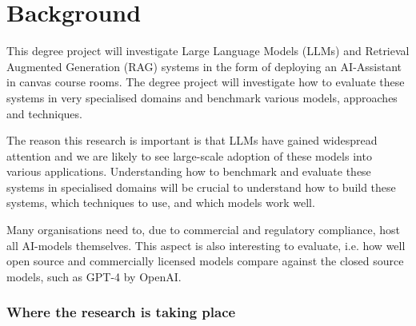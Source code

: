 

\section{Background}
\label{sec:background}

This degree project will investigate Large Language Models (\gls{LLMs}) and Retrieval Augmented Generation (\gls{RAG}) systems in the form of deploying an AI-Assistant in canvas course rooms. The degree project will investigate how to evaluate these systems in very specialised domains and benchmark various models, approaches and techniques.

The reason this research is important is that LLMs have gained widespread attention and we are likely to see large-scale adoption of these models into various applications. Understanding how to benchmark and evaluate these systems in specialised domains will be crucial to understand how to build these systems, which techniques to use, and which models work well.

Many organisations need to, due to commercial and regulatory compliance, host all AI-models themselves. This aspect is also interesting to evaluate, i.e. how well open source and commercially licensed models compare against the closed source models, such as GPT-4 by OpenAI.


\subsubsection{Where the research is taking place}

